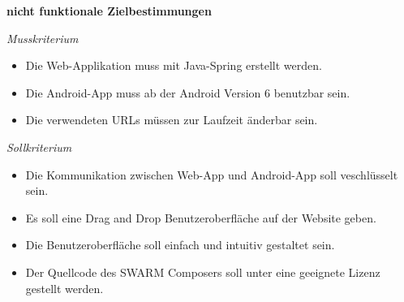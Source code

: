 \textbf{nicht funktionale Zielbestimmungen}\newline

\textit{Musskriterium}

\begin{itemize}[leftmargin=4pc]
	\item Die Web-Applikation muss mit Java-Spring erstellt werden.
	\item Die Android-App muss ab der Android Version 6 benutzbar sein.
	\item Die verwendeten URLs müssen zur Laufzeit änderbar sein.
\end{itemize}

\textit{Sollkriterium}

\begin{itemize}[leftmargin=4pc]
	\item Die Kommunikation zwischen Web-App und Android-App soll veschlüsselt sein.
	\item Es soll eine Drag and Drop Benutzeroberfläche auf der Website geben.
	\item Die Benutzeroberfläche soll einfach und intuitiv gestaltet sein.
	\item Der Quellcode des SWARM Composers soll unter eine geeignete Lizenz gestellt werden.
\end{itemize}

